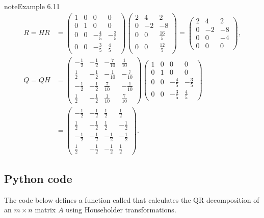 \documentclass[letterpaper,10pt,english]{jupyterBook}
\begin{document}
\begin{sphinxadmonition}{note}{Example 6.11}
\begin{align*}
    R = H R &= \left(\begin{matrix}1 & 0 & 0 & 0\\0 & 1 & 0 & 0\\0 & 0 & - \frac{4}{5} & - \frac{3}{5}\\0 & 0 & - \frac{3}{5} & \frac{4}{5}\end{matrix}\right)\left(\begin{matrix}2 & 4 & 2\\0 & -2 & -8\\0 & 0 & \frac{16}{5}\\0 & 0 & \frac{12}{5}\end{matrix}\right) = \left(\begin{matrix}2 & 4 & 2\\0 & -2 & -8\\0 & 0 & -4\\0 & 0 & 0\end{matrix}\right), \\
    Q = Q H &= \left(\begin{matrix}- \frac{1}{2} & - \frac{1}{2} & - \frac{7}{10} & \frac{1}{10}\\\frac{1}{2} & - \frac{1}{2} & - \frac{1}{10} & - \frac{7}{10}\\- \frac{1}{2} & - \frac{1}{2} & \frac{7}{10} & - \frac{1}{10}\\\frac{1}{2} & - \frac{1}{2} & \frac{1}{10} & \frac{7}{10}\end{matrix}\right)\left(\begin{matrix}1 & 0 & 0 & 0\\0 & 1 & 0 & 0\\0 & 0 & - \frac{4}{5} & - \frac{3}{5}\\0 & 0 & - \frac{3}{5} & \frac{4}{5}\end{matrix}\right) \\
    &= \left(\begin{matrix}- \frac{1}{2} & - \frac{1}{2} & \frac{1}{2} & \frac{1}{2}\\\frac{1}{2} & - \frac{1}{2} & \frac{1}{2} & - \frac{1}{2}\\- \frac{1}{2} & - \frac{1}{2} & - \frac{1}{2} & - \frac{1}{2}\\\frac{1}{2} & - \frac{1}{2} & - \frac{1}{2} & \frac{1}{2}\end{matrix}\right).
\end{align*}\end{sphinxadmonition}


\subsection{Python code}
\label{\detokenize{6_Direct_methods/6.4_QR_decomposition:id2}}
\sphinxAtStartPar
The code below defines a function called  that calculates the QR decomposition of an \(m\times n\) matrix \(A\) using Householder transformations.
\end{document}

